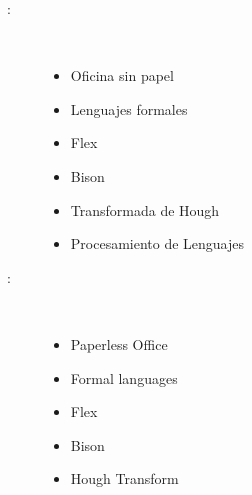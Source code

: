 \begin{multicols}{2}
\begin{description}
\item [\palabraschaveprincipal:] \mbox{} \\[-20pt]
  \begin{itemize}
      \item Oficina sin papel 
      \item Lenguajes formales
      \item Flex
      \item Bison
      \item Transformada de Hough
      \item Procesamiento de Lenguajes
  \end{itemize}
\end{description}
\begin{description}
\item [\palabraschavesecundaria:] \mbox{} \\[-20pt]
  \begin{itemize}
      \item Paperless Office
      \item Formal languages
      \item Flex
      \item Bison
      \item Hough Transform
  \end{itemize}

\end{description}
\end{multicols}
